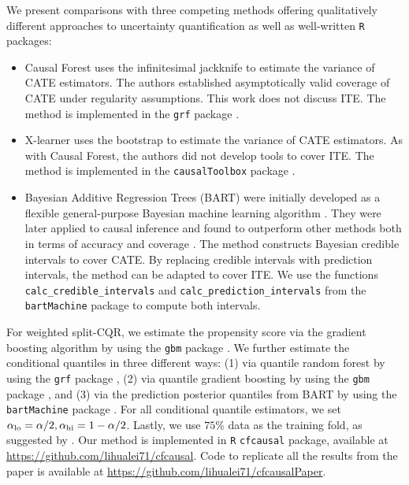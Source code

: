   We present comparisons with three competing methods offering
  qualitatively different approaches to uncertainty quantification as
  well as well-written \texttt{R} packages:
  \begin{itemize}
  \item Causal Forest \citep{wager2018estimation} uses the
    infinitesimal jackknife \citep{efron2014estimation,
      wager2014confidence} to estimate the variance of CATE
    estimators. The authors established asymptotically valid coverage
    of CATE under regularity assumptions. This work does not
    discuss ITE. The method is implemented in the \texttt{grf} package
    \citep{grf}.
  \item X-learner \citep{kunzel2019metalearners} uses the bootstrap to
    estimate the variance of CATE estimators. As with Causal Forest,
    the authors did not develop tools to cover ITE. The method is
    implemented in the \texttt{causalToolbox} package
    \citep{xlearner}.
  \item Bayesian Additive Regression Trees (BART) were initially
    developed as a flexible general-purpose Bayesian machine learning
    algorithm \citep{chipman2010bart}. They were later applied to
    causal inference \citep[e.g.][]{hill2011bayesian,
      green2012modeling, hahn2020bayesian} and found to outperform
    other methods both in terms of accuracy and coverage
    \citep{dorie2017aciccomp2016, dorie2019automated}. The method
    constructs Bayesian credible intervals to cover CATE.  By
    replacing credible intervals with prediction intervals, the method
    can be adapted to cover ITE. We use the functions
    \texttt{calc\_credible\_intervals} and
    \texttt{calc\_prediction\_intervals} from the \texttt{bartMachine}
    package \citep{bartMachine} to compute both intervals.
  \end{itemize}
  For weighted split-CQR, we estimate the propensity score via the
  gradient boosting algorithm \citep{friedman2001greedy} by using the
  \texttt{gbm} package \citep{gbm}. We further estimate the
  conditional quantiles in three different ways: (1) via quantile
  random forest \citep{athey2019generalized} by using the \texttt{grf}
  package \citep{grf}, (2) via quantile gradient boosting by using the
  \texttt{gbm} package \citep{gbm}, and (3) via the prediction
  posterior quantiles from BART by using the \texttt{bartMachine}
  package \citep{bartMachine}. For all conditional quantile
  estimators, we set
  $\alpha_{\mathrm{lo}} = \alpha / 2, \alpha_{\mathrm{hi}} = 1 - \alpha / 2$. Lastly,
  we use $75\%$ data as the training fold, as suggested by
  \cite{sesia2019comparison}. Our method is implemented in \texttt{R}
  \texttt{cfcausal} package, available at
  \url{https://github.com/lihualei71/cfcausal}. Code to replicate all
  the results from the paper is available at
  \url{https://github.com/lihualei71/cfcausalPaper}. 

